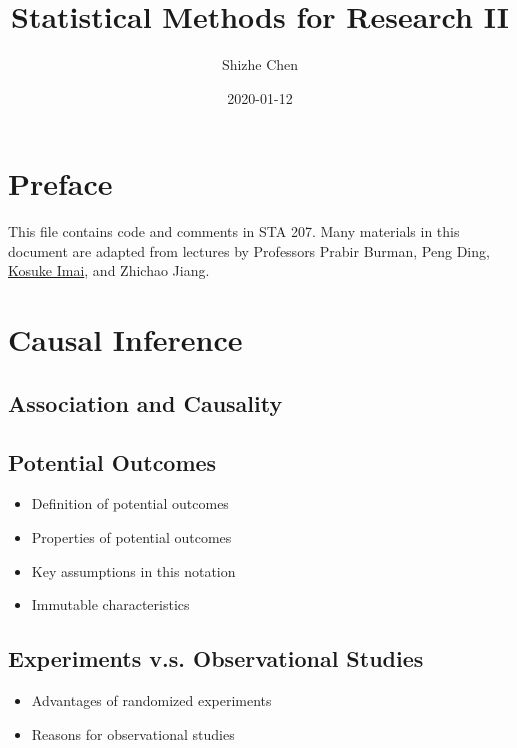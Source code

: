 \documentclass[12pt,]{book}
\title{Statistical Methods for Research II}
\author{Shizhe Chen}
\date{2020-01-12}
\providecommand{\tightlist}{%
  \setlength{\itemsep}{0pt}\setlength{\parskip}{0pt}}
\begin{document}
\maketitle

{
\setcounter{tocdepth}{1}
\tableofcontents
}
\chapter*{Preface}\label{pre}

This file contains code and comments in STA 207. Many materials in this
document are adapted from lectures by Professors Prabir Burman, Peng
Ding, \href{https://imai.fas.harvard.edu/teaching/index.html}{Kosuke
Imai}, and Zhichao Jiang.

\chapter{Causal Inference}\label{ch:causal}

\section{Association and Causality}\label{association-and-causality}

\section{Potential Outcomes}\label{potential-outcomes}

\begin{itemize}
\tightlist
\item
  Definition of potential outcomes
\item
  Properties of potential outcomes
\item
  Key assumptions in this notation
\item
  Immutable characteristics
\end{itemize}

\section{Experiments v.s. Observational
Studies}\label{experiments-v.s.-observational-studies}

\begin{itemize}
\tightlist
\item
  Advantages of randomized experiments
\item
  Reasons for observational studies
\end{itemize}
\end{document}
